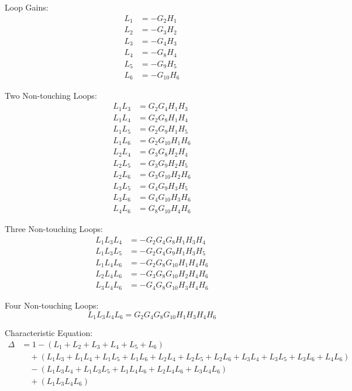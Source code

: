 \documentclass[11pt]{article}
\begin{document}
Loop Gains:
\begin{align*}
L_1 &= -G_2 H_1 \\
L_2 &= -G_3 H_2 \\
L_3 &= -G_4 H_3 \\
L_4 &= -G_8 H_4 \\
L_5 &= -G_9 H_5 \\
L_6 &= -G_{10} H_6
\end{align*}

\vspace{0.5em}

Two Non-touching Loops:
\begin{align*}
L_1 L_3 &= G_2 G_4 H_1 H_3 \\
L_1 L_4 &= G_2 G_8 H_1 H_4 \\
L_1 L_5 &= G_2 G_9 H_1 H_5 \\
L_1 L_6 &= G_2 G_{10} H_1 H_6 \\
L_2 L_4 &= G_3 G_8 H_2 H_4 \\
L_2 L_5 &= G_3 G_9 H_2 H_5 \\
L_2 L_6 &= G_3 G_{10} H_2 H_6 \\
L_3 L_5 &= G_4 G_9 H_3 H_5 \\
L_3 L_6 &= G_4 G_{10} H_3 H_6 \\
L_4 L_6 &= G_8 G_{10} H_4 H_6
\end{align*}

\vspace{0.5em}

Three Non-touching Loops:
\begin{align*}
L_1 L_3 L_4 &= -G_2 G_4 G_8 H_1 H_3 H_4 \\
L_1 L_3 L_5 &= -G_2 G_4 G_9 H_1 H_3 H_5 \\
L_1 L_4 L_6 &= -G_2 G_8 G_{10} H_1 H_4 H_6 \\
L_2 L_4 L_6 &= -G_3 G_8 G_{10} H_2 H_4 H_6 \\
L_3 L_4 L_6 &= -G_4 G_8 G_{10} H_3 H_4 H_6
\end{align*}

\vspace{0.5em}

Four Non-touching Loops:
\[
L_1 L_3 L_4 L_6 = G_2 G_4 G_8 G_{10} H_1 H_3 H_4 H_6
\]

\vspace{1em}

Characteristic Equation:
\[
\begin{aligned}
\Delta &= 1 - (L_1 + L_2 + L_3 + L_4 + L_5 + L_6) \\
&\quad + (L_1 L_3 + L_1 L_4 + L_1 L_5 + L_1 L_6 + L_2 L_4 + L_2 L_5 + L_2 L_6 + L_3 L_4 + L_3 L_5 + L_3 L_6 + L_4 L_6) \\
&\quad - (L_1 L_3 L_4 + L_1 L_3 L_5 + L_1 L_4 L_6 + L_2 L_4 L_6 + L_3 L_4 L_6) \\
&\quad + (L_1 L_3 L_4 L_6)
\end{aligned}
\]
\end{document}
